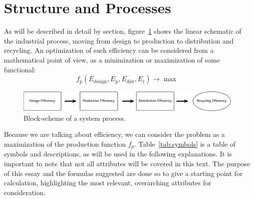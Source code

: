 \documentclass[10pt, a4paper, cleardoubleempty, openright, twoside]{book}
\begin{document}
\section {Structure and Processes}

As will be described in detail by section,
figure~\ref{fig:systemProcess} shows the linear schematic of the
industrial process, moving from design to production to distribution and
recycling. An optimization of such efficiency can be considered from a
mathematical point of view, as a minimization or maximization of some
functional:
$$
f_\text{p}(E_\text{design}, E_\text{p}, E_\text{dist}, E_\text{r}) \rightarrow
\max
$$

\begin{figure}[bt!]
	\includegraphics[width=\textwidth]{figures/system-process.pdf}
	\caption {Block-scheme of a system process.}
	\label{fig:systemProcess}
\end{figure}

Because we are talking about efficiency, we can consider the 
problem as a maximization of the production function $f_p$.
Table~\ref{tab:symbols} is a table of symbols and descriptions, as will
be used in the following explanations. It is important to note that not
all attributes will be covered in this text. The purpose of this essay
and the formulas suggested are done so to give a starting point for
calculation, highlighting the most relevant, overarching attributes for
consideration.
\end{document}
